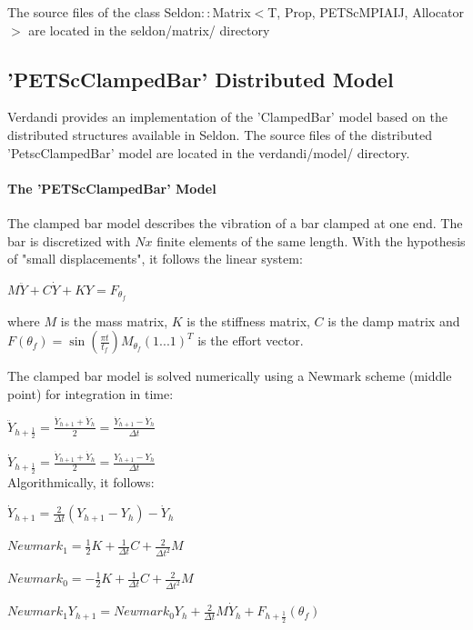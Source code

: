 The source files of the class Seldon$::$Matrix$<$T, Prop, PETScMPIAIJ, Allocator$>$   are located in the seldon/matrix/ directory



\hypertarget{seq-par-dm}{}\subsection{'PETScClampedBar' Distributed Model}\label{seq-par-dm}


Verdandi provides an implementation of the 'ClampedBar' model based on the distributed structures available in Seldon. The source files of the distributed 'PetscClampedBar' model are located in the verdandi/model/ directory.



\hypertarget{seq-par-dm-m}{}\paragraph{The 'PETScClampedBar' Model}\label{seq-par-dm-m}


The clamped bar model describes the vibration of a bar clamped at one end. The bar is discretized with $Nx$ finite elements of the same length. With the hypothesis of "small displacements", it follows the linear system:

\begin{center} $ M \ddot Y + C \dot Y + K Y = F_{\theta_f}$ \par
 \end{center}

 where $M$  is the mass matrix, $K$  is the stiffness matrix,  $C$  is the damp matrix and  $F(\theta_f) = \sin(\frac{\pi t}{t_f}) M_{\theta_f} (1 ... 1)^T$  is the effort vector.


 The clamped bar model is solved numerically using a Newmark scheme (middle point) for integration in time:

 $ \ddot Y_{h + \frac{1}{2}} = \frac{\ddot Y_{h+1} + \ddot Y_{h} }2 = \frac{\dot Y_{h+1} - \dot Y_{h} } {\Delta t} $ \par
$ \dot Y_{h + \frac{1}{2}} = \frac{\dot Y_{h+1} + \dot Y_{h} }2 = \frac{Y_{h+1} - Y_{h} } {\Delta t} $\\


Algorithmically, it follows:

$ \dot Y_{h + 1} = \frac{2}{\Delta t}(Y_{h+1} - Y_{h}) - \dot Y_{h} $ \par
$Newmark_1 = \frac{1}2K + \frac{1}{\Delta t}C + \frac{2}{\Delta t^2}M$ \par
$Newmark_0 = -\frac{1}2 K + \frac{1}{\Delta t}C + \frac{2}{\Delta t^2}M$ \par
$Newmark_1Y_{h+1} = Newmark_0Y_{h} + \frac{2}{\Delta t}M\dot Y_{h} + F_{h + \frac{1}{2}}(\theta_f)$\\

